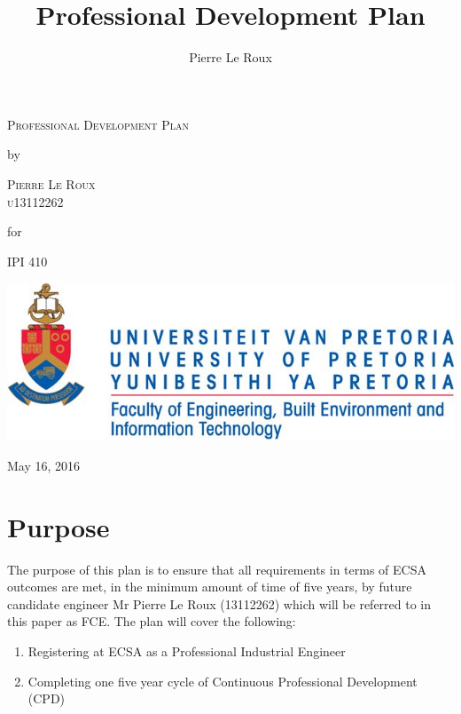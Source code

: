 \documentclass[11pt,a4paper]{article}
\title{Professional Development Plan}
\author{Pierre Le Roux}
\begin{document}
	\begin{titlepage}
		\noindent\makebox[\linewidth]{\rule{\paperwidth}{0.4pt}}
		
		\centering
		\vspace*{1cm}
		{\scshape\LARGE Professional Development Plan \par}
		\vspace{1,5cm}		
		{ by \par}
		\vspace{1,5cm}
		{\scshape\LARGE Pierre Le Roux \\
						u13112262\par}
		\vspace{1,5cm}	
		{ for \par}
		\vspace{1,5cm}
		{\scshape\LARGE IPI 410}
						
		\vspace{2,5cm}
		\includegraphics[width=\textwidth]{Extra/Tuks_Logo.jpg}
		

		\vfill						
		{\large May 16, 2016\par}
		
		\vspace*{1cm}	
		\noindent\makebox[\linewidth]{\rule{\paperwidth}{0.4pt}}
	\end{titlepage}
	
	\pagebreak
	
	\setcounter{page}{1}
	
	\section{Purpose}
		The purpose of this plan is to ensure that all requirements in terms of ECSA outcomes are met, in the minimum amount of time of five years, by future candidate engineer Mr Pierre Le Roux (13112262) which will be referred to in this paper as FCE.
		The plan will cover the following:
		
		\begin{enumerate}
		\item	Registering at ECSA as a Professional Industrial Engineer
		
		\item	Completing one five year cycle of Continuous Professional Development (CPD)
		\end{enumerate}
		
\end{document}
